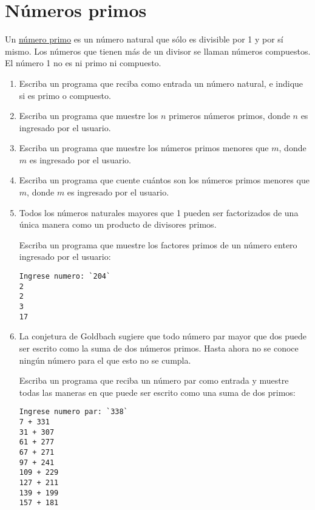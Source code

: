 \section{Números primos}

Un \href{http://es.wikipedia.org/wiki/N\%C3\%BAmero\_primo}{número
primo} es un número natural que sólo es divisible por 1 y por sí mismo.
Los números que tienen más de un divisor se llaman números compuestos.
El número 1 no es ni primo ni compuesto.

\begin{enumerate}

\item
  Escriba un programa que reciba como entrada un número natural, e
  indique si es primo o compuesto.

\item
  Escriba un programa que muestre los \(n\) primeros números primos, donde
  \(n\) es ingresado por el usuario.

\item
  Escriba un programa que muestre los números primos menores que \(m\),
  donde \(m\) es ingresado por el usuario.

\item
  Escriba un programa que cuente cuántos son los números primos menores
  que \(m\), donde \(m\) es ingresado por el usuario.

\item
  Todos los números naturales mayores que 1 pueden ser factorizados de
  una única manera como un producto de divisores primos.

  Escriba un programa que muestre los factores primos de un número
  entero ingresado por el usuario:

\begin{lstlisting}[language=testcase]
Ingrese numero: `204`
2
2
3
17
\end{lstlisting}

\item
  La conjetura de Goldbach sugiere que todo número par mayor que dos
  puede ser escrito como la suma de dos números primos. Hasta ahora no
  se conoce ningún número para el que esto no se cumpla.

  Escriba un programa que reciba un número par como entrada y muestre
  todas las maneras en que puede ser escrito como una suma de dos
  primos:
\begin{lstlisting}[language=testcase]
Ingrese numero par: `338`
7 + 331
31 + 307
61 + 277
67 + 271
97 + 241
109 + 229
127 + 211
139 + 199
157 + 181
\end{lstlisting}


\end{enumerate}
